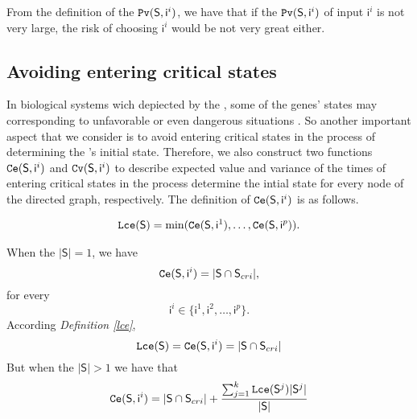 From the definition of the ${\tt Pv}(\mathsf{S}, \mathsf{ i}^{i})$, we have that if the ${\tt Pv}(\mathsf{S}, \mathsf{ i}^{i})$ of input $\mathsf{ i}^{i}$ is not very large, the risk of choosing $\mathsf{ i}^{i}$ would be not very great either.
\subsection{Avoiding entering critical states}
In biological systems wich depiected by the \BCNs, some of the genes' states may corresponding to unfavorable or even dangerous situations \cite{Li2014Controllability}. So another important aspect that we consider is to avoid entering critical states in the process of determining the \BCN's initial state. Therefore, we also construct two functions ${\tt Ce}(\mathsf{S}, \mathsf{ i}^{i})$ and ${\tt Cv}(\mathsf{S}, \mathsf{ i}^{i})$ to describe expected value and variance of the times of entering critical states in the process determine the intial state for every node of the directed graph, respectively. The definition of ${\tt Ce}(\mathsf{S}, \mathsf{ i}^{i})$ is as follows.\\
\begin{definition} \label{lce}
\begin{equation}
\begin{split}
{\tt Lce}(\mathsf{S})= \min({\tt Ce}(\mathsf{S}, \mathsf{ i}^{1}),\ldots,{\tt Ce}(\mathsf{S}, \mathsf{ i}^{p})).
\end{split}
\end{equation}
\end{definition}
\begin{definition} 
When the $|\mathsf{S}|=1$, we have \[{\tt Ce}(\mathsf{S}, \mathsf{ i}^{i})=|\mathsf{S} \cap \mathsf{S}_{cri} |,\]  for every \[\mathsf{ i}^{i} \in \{\mathsf{ i}^{1},\mathsf{ i}^{2},\ldots, \mathsf{ i}^{p}\}.\]  
According {\em Definition \ref{lce}}, %
\[{\tt Lce}(\mathsf{S})={\tt Ce}(\mathsf{S}, \mathsf{ i}^{i})=|\mathsf{S} \cap \mathsf{S}_{cri} |\] 
But when the $|\mathsf{S}|>1$ 
we have that 
\begin{equation}
\begin{split}
{\tt Ce}(\mathsf{S}, \mathsf{ i}^{i})=|\mathsf{S} \cap \mathsf{S}_{cri}| +\frac{\sum_{j=1}^k {\tt Lce}(\mathsf{S}^{j})|\mathsf{S}^{j}|}{ |\mathsf{S}|} 
\end{split}
\end{equation}
\end{definition}

